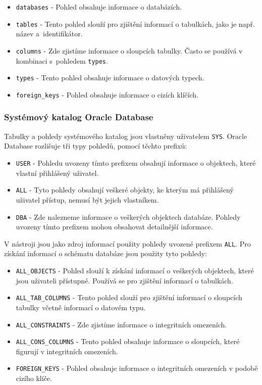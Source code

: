 \documentclass[czech,bachelor,public,dept460,male,oneside]{diploma}
\begin{document}
  		\begin{itemize}
  			\item \texttt{databases} - Pohled obsahuje informace o databázích.
  			\item \texttt{tables} - Tento pohled slouží pro zjištění informací o tabulkách, jako je např. název a~identifikátor.
  			\item \texttt{columns} - Zde zjistíme informace o sloupcích tabulky. Často se používá v kombinaci s~pohledem \texttt{types}.
  			\item \texttt{types} - Tento pohled obsahuje informace o datových typech.
  			\item \texttt{foreign\_keys} - Pohled obsahuje informace o cizích klíčích.
  		\end{itemize}
  		
  		\subsubsection{Systémový katalog Oracle Database}
  		Tabulky a pohledy systémového katalog jsou vlastněny uživatelem \texttt{SYS}. Oracle Database rozlišuje tři typy pohledů, pomocí těchto prefixů:
  		
  		\begin{itemize}
  			\item \texttt{USER} - Pohledu uvozeny tímto prefixem obsahují informace o objektech, které vlastní přihlášený uživatel.
  			\item \texttt{ALL} - Tyto pohledy obsahují veškeré objekty, ke kterým má přihlášený uživatel přístup, nemusí být jejich vlastníkem.
  			\item \texttt{DBA} - Zde nalezneme informace o veškerých objektech databáze. Pohledy uvozeny tímto prefixem mohou obsahovat detailnější informace.
  		\end{itemize} 
	
		V nástroji jsou jako zdroj informací použity pohledy uvozené prefixem \texttt{ALL}. Pro získání informací o schématu databáze jsou použity tyto pohledy:
		
		\begin{itemize}
			\item \texttt{ALL\_OBJECTS} - Pohled slouží k získání informací o veškerých objektech, které jsou uživateli přístupné. Používá se pro zjištění informací o tabulkách.
			\item \texttt{ALL\_TAB\_COLUMNS} - Tento pohled slouží pro zjištění informací o sloupcích tabulky včetně informací o datovém typu.
			\item \texttt{ALL\_CONSTRAINTS} - Zde zjistíme informace o integritních omezeních.
			\item \texttt{ALL\_CONS\_COLUMNS} - Tento pohled obsahuje informace o sloupcích, které figurují v integritních omezeních.
			\item \texttt{FOREIGN\_KEYS} - Pohled obsahuje informace o integritních omezeních v podobě cizího klíče.
		\end{itemize}
		
\end{document}
